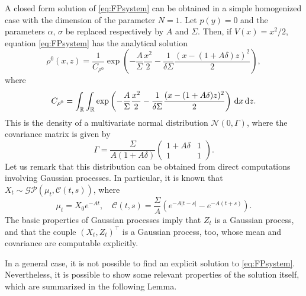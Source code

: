 \documentclass[10pt]{article}
\begin{document}
\begin{example}\label{ex:OrnUhl} A closed form solution of \eqref{eq:FPsystem} can be obtained in a simple homogenized case with the dimension of the parameter $N=1$. Let $p(y) = 0$ and the parameters $\alpha$, $\sigma$ be replaced respectively by $A$ and $\Sigma$. Then, if $V(x) = x^2/2$, equation \eqref{eq:FPsystem} has the analytical solution 
\begin{equation}
\rho^0(x,z) = \frac{1}{C_{\rho^0}} \exp\left(-\frac{A}{\Sigma} \frac{x^2}{2} - \frac{1}{\delta \Sigma} \frac{(x - (1+A \delta)z)^2}{2}\right),
\end{equation}
where
\begin{equation}
C_{\rho^0} = \int_{\mathbb{R}} \int_{\mathbb{R}} \exp\left(-\frac{A}{\Sigma} \frac{x^2}{2} - \frac{1}{\delta \Sigma} \frac{(x - (1+A \delta)z)^2}{2}\right) \,\mathrm{d} x \,\mathrm{d} z.
\end{equation}
This is the density of a multivariate normal distribution $\mathcal N(0, \Gamma)$, where the covariance matrix is given by
\begin{equation}
\Gamma = \frac{\Sigma}{A (1 + A\delta)} \begin{pmatrix} 1+A\delta & 1 \\ 1 & 1 \end{pmatrix}.
\end{equation}
Let us remark that this distribution can be obtained from direct computations involving Gaussian processes. In particular, it is known that $X_t \sim \mathcal{GP}(\mu_t, \mathcal C(t, s))$, where 
\begin{equation}
	\mu_t = X_0 e^{-At}, \quad \mathcal C(t, s) = \frac{\Sigma}{A} \left( e^{-A|t-s|} - e^{-A(t+s)} \right).
\end{equation}
The basic properties of Gaussian processes imply that $Z_t$ is a Gaussian process, and that the couple $(X_t, Z_t)^\top$ is a Gaussian process, too, whose mean and covariance are computable explicitly.
\end{example}

In a general case, it is not possible to find an explicit solution to \eqref{eq:FPsystem}. Nevertheless, it is possible to show some relevant properties of the solution itself, which are summarized in the following Lemma.
\end{document}
